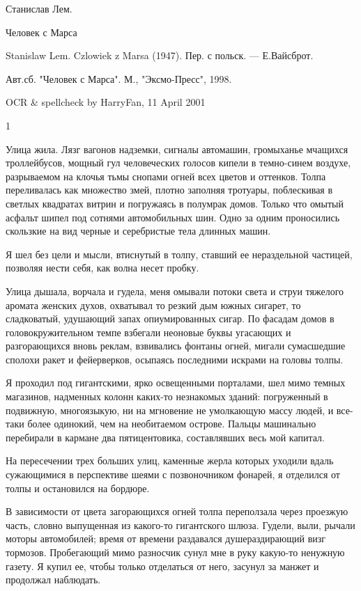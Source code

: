 
 Станислав Лем.

 Человек с Марса




Stanislaw Lem. Czlowiek z Marsa (1947). Пер. с польск. --- Е.Вайсброт.

Авт.сб. "Человек с Марса". М., "Эксмо-Пресс", 1998.

OCR \& spellcheck by HarryFan, 11 April 2001






1

\bigskip{}


Улица  жила.  Лязг  вагонов  надземки,  сигналы  автомашин,  громыханье
мчащихся  троллейбусов,  мощный  гул   человеческих   голосов   кипели   в
темно-синем воздухе, разрываемом на клочья тьмы снопами огней всех  цветов
и  оттенков.  Толпа  переливалась  как  множество  змей,  плотно  заполняя
тротуары, поблескивая в светлых квадратах витрин и погружаясь  в  полумрак
домов. Только что омытый асфальт шипел под сотнями автомобильных шин. Одно
за одним проносились скользкие на вид черные и  серебристые  тела  длинных
машин.

Я шел без цели и мысли, втиснутый  в  толпу,  ставший  ее  нераздельной
частицей, позволяя нести себя, как волна несет пробку.

Улица дышала, ворчала и гудела,  меня  омывали  потоки  света  и  струи
тяжелого аромата женских духов, охватывал то резкий дым южных сигарет,  то
сладковатый, удушающий запах опиумированных  сигар.  По  фасадам  домов  в
головокружительном темпе взбегали неоновые буквы угасающих и разгорающихся
вновь реклам, взвивались фонтаны огней, мигали сумасшедшие сполохи ракет и
фейерверков, осыпаясь последними искрами на головы толпы.

Я проходил под гигантскими, ярко освещенными порталами, шел мимо темных
магазинов, надменных колонн  каких-то  незнакомых  зданий:  погруженный  в
подвижную, многоязыкую, ни на  мгновение  не  умолкающую  массу  людей,  и
все-таки более одинокий, чем на  необитаемом  острове.  Пальцы  машинально
перебирали в кармане два пятицентовика, составлявших весь мой капитал.

На пересечении трех больших улиц, каменные жерла которых уходили  вдаль
сужающимися в перспективе шеями с позвоночником фонарей,  я  отделился  от
толпы и остановился на бордюре.

В зависимости от  цвета  загорающихся  огней  толпа  переползала  через
проезжую часть, словно выпущенная из какого-то гигантского шлюза.  Гудели,
выли,   рычали   моторы   автомобилей;   время   от   времени   раздавался
душераздирающий визг тормозов. Пробегающий мимо разносчик сунул мне в руку
какую-то ненужную газету. Я купил ее, чтобы  только  отделаться  от  него,
засунул за манжет и продолжал наблюдать.

